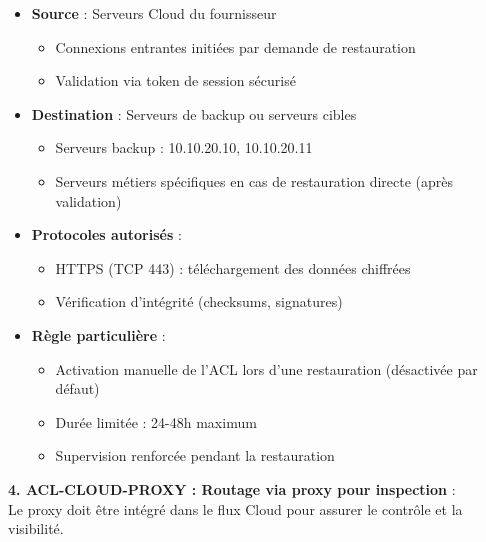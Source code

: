 \begin{itemize}
  \item \textbf{Source} : Serveurs Cloud du fournisseur
  \begin{itemize}
    \item Connexions entrantes initiées par demande de restauration
    \item Validation via token de session sécurisé
  \end{itemize}
  
  \item \textbf{Destination} : Serveurs de backup ou serveurs cibles
  \begin{itemize}
    \item Serveurs backup : 10.10.20.10, 10.10.20.11
    \item Serveurs métiers spécifiques en cas de restauration directe (après validation)
  \end{itemize}
  
  \item \textbf{Protocoles autorisés} :
  \begin{itemize}
    \item HTTPS (TCP 443) : téléchargement des données chiffrées
    \item Vérification d'intégrité (checksums, signatures)
  \end{itemize}
  
  \item \textbf{Règle particulière} :
  \begin{itemize}
    \item Activation manuelle de l'ACL lors d'une restauration (désactivée par défaut)
    \item Durée limitée : 24-48h maximum
    \item Supervision renforcée pendant la restauration
  \end{itemize}
\end{itemize}

\medskip

\noindent \textbf{4. ACL-CLOUD-PROXY : Routage via proxy pour inspection} :\\
Le proxy doit être intégré dans le flux Cloud pour assurer le contrôle et la visibilité.


